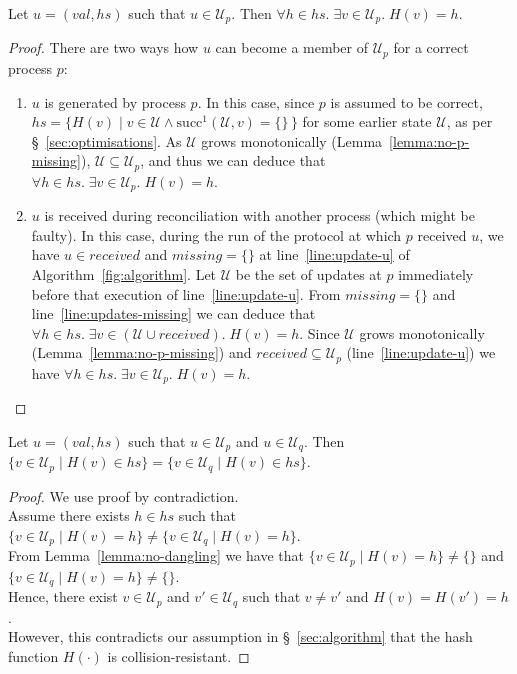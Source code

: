 \documentclass[a4paper,anonymous,USenglish]{lipics-v2019}
\begin{document}
\begin{lemma}\label{lemma:no-dangling}
Let $u = (\mathit{val}, \mathit{hs})$ such that $u \in \mathcal{U}_p$.
Then $\forall h \in \mathit{hs}.\; \exists v \in \mathcal{U}_p.\; H(v) = h$.
\end{lemma}
\begin{proof}
There are two ways how $u$ can become a member of $\mathcal{U}_p$ for a correct process $p$:
\begin{enumerate}
    \item $u$ is generated by process $p$.
    In this case, since $p$ is assumed to be correct, $\mathit{hs} = \{H(v) \mid v \in \mathcal{U} \wedge \mathrm{succ}^1(\mathcal{U}, v) = \{\}\,\}$ for some earlier state $\mathcal{U}$, as per \S~\ref{sec:optimisations}.
    As $\mathcal{U}$ grows monotonically (Lemma~\ref{lemma:no-p-missing}), $\mathcal{U} \subseteq \mathcal{U}_p$, and thus we can deduce that $\forall h \in \mathit{hs}.\; \exists v \in \mathcal{U}_p.\; H(v) = h$.
    \item $u$ is received during reconciliation with another process (which might be faulty).
    In this case, during the run of the protocol at which $p$ received $u$, we have $u \in \mathit{received}$ and $\mathit{missing} = \{\}$ at line~\ref{line:update-u} of Algorithm~\ref{fig:algorithm}.
    Let $\mathcal{U}$ be the set of updates at $p$ immediately before that execution of line~\ref{line:update-u}.
    From $\mathit{missing} = \{\}$ and line~\ref{line:updates-missing} we can deduce that $\forall h \in \mathit{hs}.\; \exists v \in (\mathcal{U} \cup \mathit{received}).\; H(v) = h$.
    Since $\mathcal{U}$ grows monotonically (Lemma~\ref{lemma:no-p-missing}) and $\mathit{received} \subseteq \mathcal{U}_p$ (line~\ref{line:update-u}) we have $\forall h \in \mathit{hs}.\; \exists v \in \mathcal{U}_p.\; H(v) = h$.
\end{enumerate}
\end{proof}

\begin{lemma}\label{lemma:no-collision}
Let $u = (\mathit{val}, \mathit{hs})$ such that $u \in \mathcal{U}_p$ and $u \in \mathcal{U}_q$.
Then $\{v \in \mathcal{U}_p \mid H(v) \in \mathit{hs}\} = \{v \in \mathcal{U}_q \mid H(v) \in \mathit{hs}\}$.
\end{lemma}
\begin{proof}
We use proof by contradiction.\\
Assume there exists $h \in \mathit{hs}$ such that $\{v \in \mathcal{U}_p \mid H(v) = h\} \neq \{v \in \mathcal{U}_q \mid H(v) = h\}$.\\
From Lemma~\ref{lemma:no-dangling} we have that $\{v \in \mathcal{U}_p \mid H(v) = h\} \neq \{\}$ and $\{v \in \mathcal{U}_q \mid H(v) = h\} \neq \{\}$.\\
Hence, there exist $v \in \mathcal{U}_p$ and $v' \in \mathcal{U}_q$ such that $v \neq v'$ and $H(v) = H(v') = h$.\\
However, this contradicts our assumption in \S~\ref{sec:algorithm} that the hash function $H(\cdot)$ is collision-resistant.
\end{proof}
\end{document}

